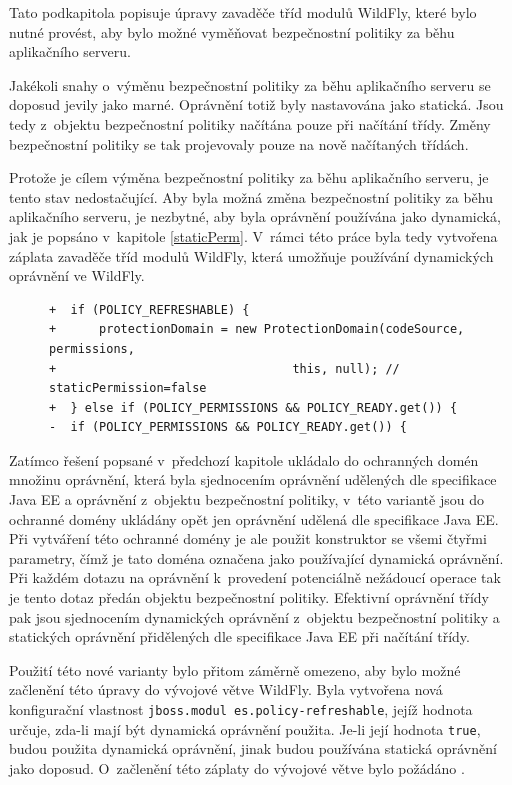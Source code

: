 Tato podkapitola popisuje úpravy zavaděče tříd modulů WildFly, které bylo nutné provést, aby bylo možné vyměňovat bezpečnostní politiky za běhu aplikačního serveru.

Jakékoli snahy o~výměnu bezpečnostní politiky za běhu aplikačního serveru se doposud jevily jako marné. Oprávnění totiž byly nastavována jako statická.
Jsou tedy z~objektu bezpečnostní politiky načítána pouze při načítání třídy. Změny bezpečnostní politiky se tak projevovaly pouze na nově načítaných třídách.

Protože je cílem výměna bezpečnostní politiky za běhu aplikačního serveru, je tento stav nedostačující.
Aby byla možná změna bezpečnostní politiky za běhu aplikačního serveru, je nezbytné, aby byla oprávnění používána jako dynamická, jak je popsáno v~kapitole \ref{staticPerm}.
V~rámci této práce byla tedy vytvořena záplata zavaděče tříd modulů WildFly, která umožňuje používání dynamických oprávnění ve WildFly.

\begin{figure}[b!]
\begin{lstlisting}[caption=Hlavní část záplaty umožňující nastavit používání dynamických oprávnění, label=refreshable]
+  if (POLICY_REFRESHABLE) {
+      protectionDomain = new ProtectionDomain(codeSource, permissions,
+                                 this, null); // staticPermission=false
+  } else if (POLICY_PERMISSIONS && POLICY_READY.get()) {
-  if (POLICY_PERMISSIONS && POLICY_READY.get()) {
\end{lstlisting}
\end{figure}

Zatímco řešení popsané v~předchozí kapitole ukládalo do ochranných domén množinu oprávnění,
která byla sjednocením oprávnění udělených dle specifikace Java EE a oprávnění z~objektu bezpečnostní politiky,
v~této variantě jsou do ochranné domény ukládány opět jen oprávnění udělená dle specifikace Java EE.
Při vytváření této ochranné domény je ale použit konstruktor se všemi čtyřmi parametry, čímž je tato doména označena jako používající dynamická oprávnění.
Při každém dotazu na oprávnění k~provedení potenciálně nežádoucí operace tak je tento dotaz předán objektu bezpečnostní politiky.
Efektivní oprávnění třídy pak jsou sjednocením dynamických oprávnění z~objektu bezpečnostní politiky a statických oprávnění přidělených dle specifikace Java EE při načítání třídy.

Použití této nové varianty bylo přitom záměrně omezeno, aby bylo možné začlenění této úpravy do vývojové větve WildFly.
Byla vytvořena nová konfigurační vlastnost {\tt jboss.modul es.policy-refreshable}, jejíž hodnota určuje, zda-li mají být dynamická oprávnění použita.
Je-li její hodnota {\tt true}, budou použita dynamická oprávnění, jinak budou používána statická oprávnění jako doposud.
O~začlenění této záplaty do vývojové větve bylo požádáno \cite{jmPullRequest}.

